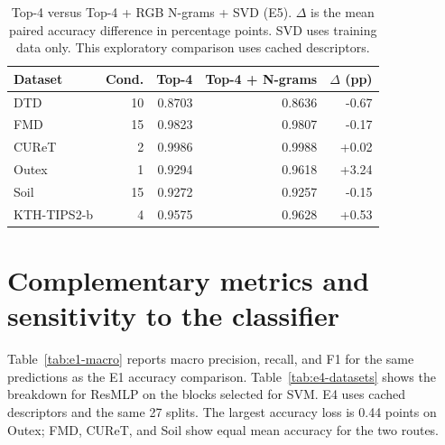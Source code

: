 \documentclass[10pt,a4paper,fleqn]{article}
\begin{document}
\begin{table}[htbp]
\centering
\caption{Top-4 versus Top-4 + RGB N-grams + SVD (E5). $\Delta$ is the mean paired accuracy difference in percentage points. SVD uses training data only. This exploratory comparison uses cached descriptors.}
\label{tab:e5-datasets}
\begin{tabular}{@{}lrrrr@{}}
\toprule
Dataset & Cond. & Top-4 & Top-4 + N-grams & $\Delta$ (pp) \\
\midrule
DTD & 10 & 0.8703 & 0.8636 & -0.67 \\
FMD & 15 & 0.9823 & 0.9807 & -0.17 \\
CUReT & 2 & 0.9986 & 0.9988 & +0.02 \\
Outex & 1 & 0.9294 & 0.9618 & +3.24 \\
Soil & 15 & 0.9272 & 0.9257 & -0.15 \\
KTH-TIPS2-b & 4 & 0.9575 & 0.9628 & +0.53 \\
\bottomrule
\end{tabular}
\end{table}
\FloatBarrier

\section{Complementary metrics and sensitivity to the classifier}

Table~\ref{tab:e1-macro} reports macro precision, recall, and F1 for the same predictions as the E1 accuracy comparison. Table~\ref{tab:e4-datasets} shows the breakdown for ResMLP on the blocks selected for SVM. E4 uses cached descriptors and the same 27 splits. The largest accuracy loss is 0.44 points on Outex; FMD, CUReT, and Soil show equal mean accuracy for the two routes.
\end{document}
